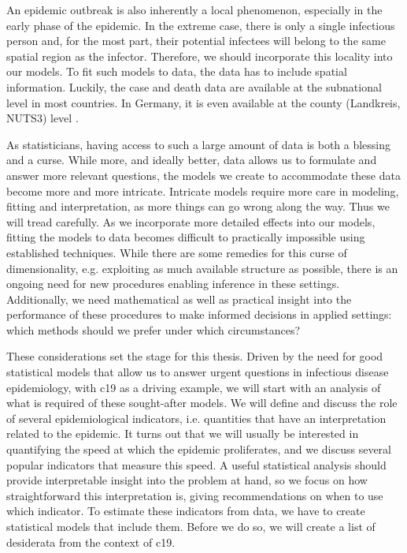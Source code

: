 An epidemic outbreak is also inherently a local phenomenon, especially in the early phase of the epidemic. In the extreme case, there is only a single infectious person and, for the most part, their potential infectees will belong to the same spatial region as the infector. Therefore, we should incorporate this locality into our models. To fit such models to data, the data has to include spatial information. Luckily, the case and death data are available at the subnational level in most countries. In Germany, it is even available at the county (Landkreis, NUTS3) level \cite{RobertKoch-Institut2022SARSCoV2}. 

As statisticians, having access to such a large amount of data is both a blessing and a curse. While more, and ideally better, data allows us to formulate and answer more relevant questions, the models we create to accommodate these data become more and more intricate. Intricate models require more care in modeling, fitting and interpretation, as more things can go wrong along the way. Thus we will tread carefully. As we incorporate more detailed effects into our models, fitting the models to data becomes difficult to practically impossible using established techniques. While there are some remedies for this curse of dimensionality, e.g. exploiting as much available structure as possible, there is an ongoing need for new procedures enabling inference in these settings. Additionally, we need mathematical as well as practical insight into the performance of these procedures to make informed decisions in applied settings: which methods should we prefer under which circumstances?

These considerations set the stage for this thesis. Driven by the need for good statistical models that allow us to answer urgent questions in infectious disease epidemiology, with \acrshort{c19} as a driving example, we will start with an analysis of what is required of these sought-after models. We will define and discuss the role of several epidemiological indicators, i.e. quantities that have an interpretation related to the epidemic. It turns out that we will usually be interested in quantifying the speed at which the epidemic proliferates, and we discuss several popular indicators that measure this speed. A useful statistical analysis should provide interpretable insight into the problem at hand, so we focus on how straightforward this interpretation is, giving recommendations on when to use which indicator. To estimate these indicators from data, we have to create statistical models that include them. Before we do so, we will create a list of desiderata from the context of \acrshort{c19}. 

